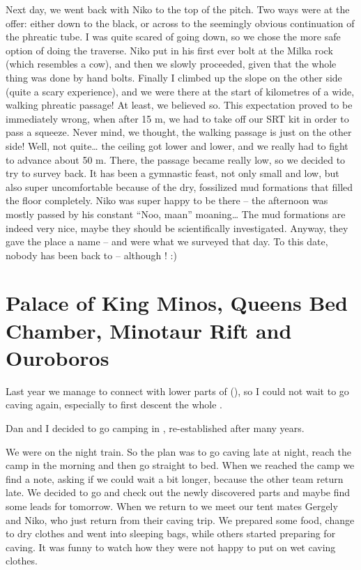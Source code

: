 Next day, we went back with Niko to the top of the pitch. Two ways were
at the offer: either down to the black, or across to the seemingly
obvious continuation of the phreatic tube. I was quite scared of going
down, so we chose the more safe option of doing the traverse. Niko put
in his first ever bolt at the Milka rock (which resembles a cow), and
then we slowly proceeded, given that the whole thing was done by hand
bolts. Finally I climbed up the slope on the other side (quite a scary
experience), and we were there at the start of kilometres of a wide,
walking phreatic passage! At least, we believed so. This expectation
proved to be immediately wrong, when after 15 m, we had to take off our
SRT kit in order to pass a squeeze. Never mind, we thought, the walking
passage is just on the other side! Well, not quite\ldots{} the ceiling
got lower and lower, and we really had to fight to advance about 50 m.
There, the passage became really low, so we decided to try to survey
back. It has been a gymnastic feast, not only small and low, but also
super uncomfortable because of the dry, fossilized mud formations that
filled the floor completely. Niko was super happy to be there -- the
afternoon was mostly passed by his constant ``Noo, maan''
moaning\ldots{} The mud formations are indeed very nice, maybe they
should be scientifically investigated. Anyway, they gave the place a
name --  and  were what we
surveyed that day. To this date, nobody has been back to  -- although !
:)





\section{Palace of King Minos, Queens Bed Chamber, Minotaur Rift and Ouroboros}


Last year we manage to connect  with lower parts of  (), so I could not wait to go caving again, especially to first descent the whole .

Dan and I decided to go camping in , re-established after many years.

We were on the night train. So the plan was to go caving late at night,
reach the camp in the morning and then go straight to bed. When we
reached the camp we find a note, asking if we could wait a bit longer,
because the other team return late. We decided to go and check out the
newly discovered parts and maybe find some leads for tomorrow. When we
return to  we meet our tent mates Gergely and Niko, who just
return from their caving trip. We prepared some food, change to dry
clothes and went into sleeping bags, while others started preparing for
caving. It was funny to watch how they were not happy to put on wet
caving clothes.

